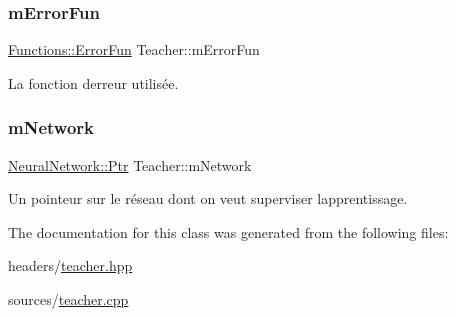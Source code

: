 \subsubsection{\texorpdfstring{m\+Error\+Fun}{mErrorFun}}
{\footnotesize\ttfamily \hyperlink{structFunctions_a834bc4170f1caa8c77272ecf51dbae5c}{Functions\+::\+Error\+Fun} Teacher\+::m\+Error\+Fun\hspace{0.3cm}{\ttfamily [private]}}



La fonction d\textquotesingle{}erreur utilisée. 

\mbox{\label{classTeacher_ae1cf0d1d29e47fd8bcf9b79b5ec52839}} 
\subsubsection{\texorpdfstring{m\+Network}{mNetwork}}
{\footnotesize\ttfamily \hyperlink{classNeuralNetwork_a31de381df65f261fd0f38e0559995d1a}{Neural\+Network\+::\+Ptr} Teacher\+::m\+Network\hspace{0.3cm}{\ttfamily [private]}}



Un pointeur sur le réseau dont on veut superviser l\textquotesingle{}apprentissage. 



The documentation for this class was generated from the following files\+:\begin{DoxyCompactItemize}
\item 
headers/\hyperlink{teacher_8hpp}{teacher.\+hpp}\item 
sources/\hyperlink{teacher_8cpp}{teacher.\+cpp}\end{DoxyCompactItemize}
